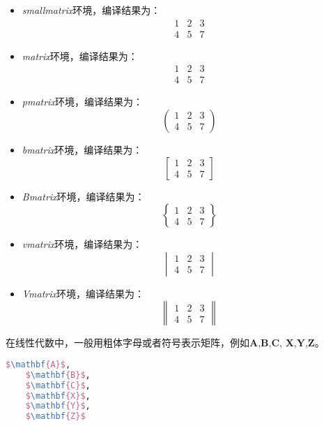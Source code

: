 \begin{itemize}
    \item \emph{smallmatrix}环境，编译结果为：
          $$\begin{smallmatrix}
                  1 & 2 & 3 \\ 4 & 5 & 7
              \end{smallmatrix}$$
    \item \emph{matrix}环境，编译结果为：
          $$\begin{matrix}
                  1 & 2 & 3 \\ 4 & 5 & 7
              \end{matrix}$$
    \item \emph{pmatrix}环境，编译结果为：
          $$\begin{pmatrix}
                  1 & 2 & 3 \\ 4 & 5 & 7
              \end{pmatrix}$$
    \item \emph{bmatrix}环境，编译结果为：
          $$\begin{bmatrix}
                  1 & 2 & 3 \\ 4 & 5 & 7
              \end{bmatrix}$$
    \item \emph{Bmatrix}环境，编译结果为：
          $$\begin{Bmatrix}
                  1 & 2 & 3 \\ 4 & 5 & 7
              \end{Bmatrix}$$
    \item \emph{vmatrix}环境，编译结果为：
          $$\begin{vmatrix}
                  1 & 2 & 3 \\ 4 & 5 & 7
              \end{vmatrix}$$
    \item \emph{Vmatrix}环境，编译结果为：
          $$\begin{Vmatrix}
                  1 & 2 & 3 \\ 4 & 5 & 7
              \end{Vmatrix}$$
\end{itemize}

在线性代数中，一般用粗体字母或者符号表示矩阵，例如$\mathbf{A}$,$\mathbf{B}$,$\mathbf{C}$,
$\mathbf{X}$,$\mathbf{Y}$,$\mathbf{Z}$。
\begin{lstlisting}[language=TeX]
    $\mathbf{A}$,
    $\mathbf{B}$,
    $\mathbf{C}$,
    $\mathbf{X}$,
    $\mathbf{Y}$,
    $\mathbf{Z}$
\end{lstlisting}

